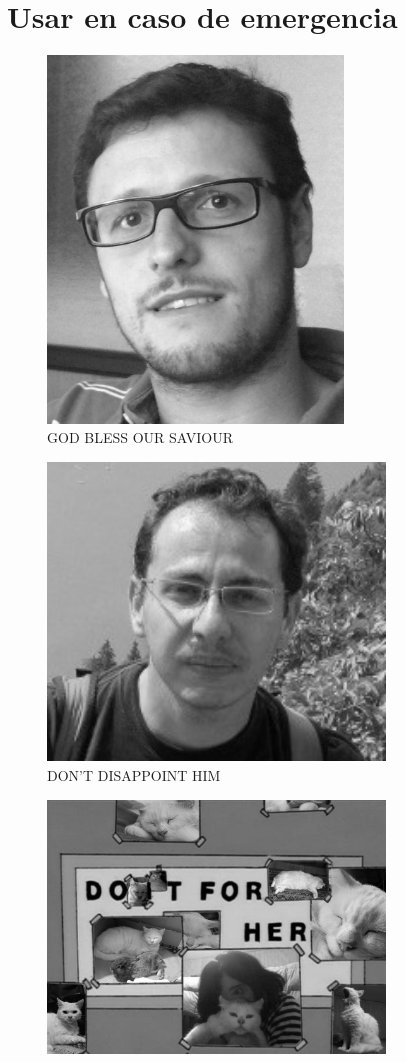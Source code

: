 \documentclass[oneside]{book}
\begin{document}
	\section{Usar en caso de emergencia}
	\begin{figure}[h]
		\centering
		\includegraphics[width=0.7\textwidth]{foto}
		\caption*{GOD BLESS OUR SAVIOUR}
	\end{figure}
	\begin{figure}[h]
		\centering
		\includegraphics[width=0.8\textwidth]{roberti3}
		\caption*{DON'T DISAPPOINT HIM}
	\end{figure}
	\begin{figure}[h]
		\centering
		\includegraphics[width=0.8\textwidth]{helga}
	\end{figure}
	\backmatter
	\printindex
\end{document}
